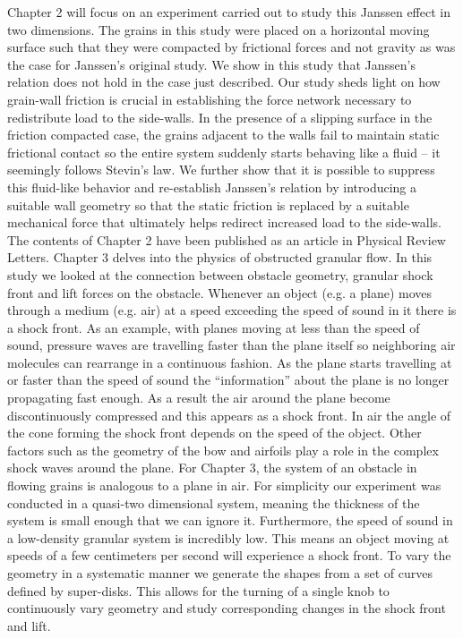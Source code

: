 Chapter 2 will focus on an experiment carried out to study this Janssen effect in two dimensions. The grains in this study were placed on a horizontal moving surface such that they were compacted by frictional forces and not gravity as was the case for Janssen’s original study. We show in this study that Janssen’s relation does not hold in the case just described. Our study sheds light on how grain-wall friction is crucial in establishing the force network necessary to redistribute load to the side-walls. In the presence of a slipping surface in the friction compacted case, the grains adjacent to the walls fail to maintain static frictional contact so the entire system suddenly starts behaving like a fluid – it seemingly follows Stevin’s law. We further show that it is possible to suppress this fluid-like behavior and re-establish Janssen’s relation by introducing a suitable wall geometry so that the static friction is replaced by a suitable mechanical force that ultimately helps redirect increased load to the side-walls. The contents of Chapter 2 have been published as an article in Physical Review Letters. 
Chapter 3 delves into the physics of obstructed granular flow. In this study we looked at the connection between obstacle geometry, granular shock front and lift forces on the obstacle. Whenever an object (e.g. a plane) moves through a medium (e.g. air) at a speed exceeding the speed of sound in it there is a shock front. As an example, with planes moving at less than the speed of sound, pressure waves are travelling faster than the plane itself so neighboring air molecules can rearrange in a continuous fashion. As the plane starts travelling at or faster than the speed of sound the “information” about the plane is no longer propagating fast enough. As a result the air around the plane become discontinuously compressed and this appears as a shock front. In air the angle of the cone forming the shock front depends on the speed of the object. Other factors such as the geometry of the bow and airfoils play a role in the complex shock waves around the plane. 
For Chapter 3, the system of an obstacle in flowing grains is analogous to a plane in air. For simplicity our experiment was conducted in a quasi-two dimensional system, meaning the thickness of the system is small enough that we can ignore it. Furthermore, the speed of sound in a low-density granular system is incredibly low. This means an object moving at speeds of a few centimeters per second will experience a shock front. To vary the geometry in a systematic manner we generate the shapes from a set of curves defined by super-disks. This allows for the turning of a single knob to continuously vary geometry and study corresponding changes in the shock front and lift. 
